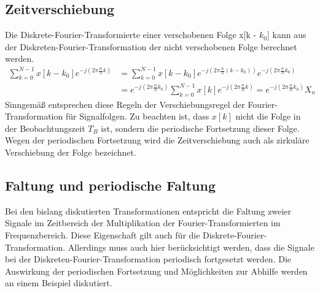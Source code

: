 \subsection{Zeitverschiebung}\label{sec:zeitverschiebung}

Die Diskrete-Fourier-Transformierte einer verschobenen Folge x{[}k - \(k_{0}\){]} kann aus der Diskreten-Fourier-Transformation der nicht verschobenen Folge berechnet werden.
\begin{align}
{\sum\limits _{k=0}^{N-1}x\left[k-k_{0} \right] e^{-j \left(2 \pi  \frac{n}{N}  k\right)}  } &=  {\sum\limits _{k=0}^{N-1}x\left[k-k_{0} \right] e^{-j \left(2 \pi  \frac{n}{N}  \left(k-k_{0} \right)\right)}  e^{-j \left(2 \pi  \frac{n}{N}  k_{0} \right)}  } \\
{} &=  {e^{-j \left(2 \pi  \frac{n}{N}  k_{0} \right)}  \sum\limits _{k=0}^{N-1}x\left[k\right] e^{-j \left(2 \pi  \frac{n}{N}  k\right)}  =e^{-j \left(2 \pi  \frac{n}{N}  k_{0} \right)}  X_{n} {\; }}
\label{eq:10.48}
\end{align}
Sinngemäß entsprechen diese Regeln der Verschiebungsregel der Fourier-Transformation für Signalfolgen. Zu beachten ist, dass \(x[k]\) nicht die Folge in der Beobachtungszeit \(T_{B}\) ist, sondern die periodische Fortsetzung dieser Folge. Wegen der periodischen Fortsetzung wird die Zeitverschiebung auch als zirkuläre Verschiebung der Folge bezeichnet.

\subsection{Faltung und periodische Faltung}\label{sec:faltung-und-periodische-faltung}

Bei den bislang diskutierten Transformationen entspricht die Faltung zweier Signale im Zeitbereich der Multiplikation der Fourier-Transformierten im Frequenzbereich. Diese Eigenschaft gilt auch für die Diskrete-Fourier-Transformation. Allerdings muss auch hier berücksichtigt werden, dass die Signale bei der Diskreten-Fourier-Transformation periodisch fortgesetzt werden. Die Auswirkung der periodischen Fortsetzung und Möglichkeiten zur Abhilfe werden an einem Beispiel diskutiert.

